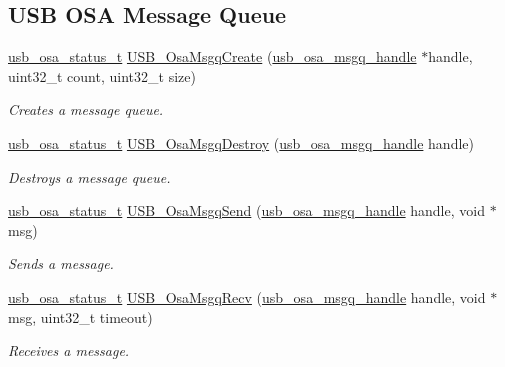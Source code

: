 \subsection*{U\-S\-B O\-S\-A Message Queue}
\begin{DoxyCompactItemize}
\item 
\hyperlink{group__usb__os__abstraction_ga8de2fb7579de0a6621bbc1776519b0a9}{usb\-\_\-osa\-\_\-status\-\_\-t} \hyperlink{group__usb__os__abstraction_gacc28243bdfb636e21508879789ab5a0c}{U\-S\-B\-\_\-\-Osa\-Msgq\-Create} (\hyperlink{group__usb__os__abstraction_gab3a9f26ba50f3abea7fcbac07500cbb8}{usb\-\_\-osa\-\_\-msgq\-\_\-handle} $\ast$handle, uint32\-\_\-t count, uint32\-\_\-t size)
\begin{DoxyCompactList}\small\item\em Creates a message queue. \end{DoxyCompactList}\item 
\hyperlink{group__usb__os__abstraction_ga8de2fb7579de0a6621bbc1776519b0a9}{usb\-\_\-osa\-\_\-status\-\_\-t} \hyperlink{group__usb__os__abstraction_gafc20008f4680ff9f0720574841b34e42}{U\-S\-B\-\_\-\-Osa\-Msgq\-Destroy} (\hyperlink{group__usb__os__abstraction_gab3a9f26ba50f3abea7fcbac07500cbb8}{usb\-\_\-osa\-\_\-msgq\-\_\-handle} handle)
\begin{DoxyCompactList}\small\item\em Destroys a message queue. \end{DoxyCompactList}\item 
\hyperlink{group__usb__os__abstraction_ga8de2fb7579de0a6621bbc1776519b0a9}{usb\-\_\-osa\-\_\-status\-\_\-t} \hyperlink{group__usb__os__abstraction_ga6ba61c6cf5e772dbce90c5626dbd0db0}{U\-S\-B\-\_\-\-Osa\-Msgq\-Send} (\hyperlink{group__usb__os__abstraction_gab3a9f26ba50f3abea7fcbac07500cbb8}{usb\-\_\-osa\-\_\-msgq\-\_\-handle} handle, void $\ast$msg)
\begin{DoxyCompactList}\small\item\em Sends a message. \end{DoxyCompactList}\item 
\hyperlink{group__usb__os__abstraction_ga8de2fb7579de0a6621bbc1776519b0a9}{usb\-\_\-osa\-\_\-status\-\_\-t} \hyperlink{group__usb__os__abstraction_gaf2effe68aa0486c0823e253f78836d17}{U\-S\-B\-\_\-\-Osa\-Msgq\-Recv} (\hyperlink{group__usb__os__abstraction_gab3a9f26ba50f3abea7fcbac07500cbb8}{usb\-\_\-osa\-\_\-msgq\-\_\-handle} handle, void $\ast$msg, uint32\-\_\-t timeout)
\begin{DoxyCompactList}\small\item\em Receives a message. \end{DoxyCompactList}\item 

\end{DoxyCompactItemize}
